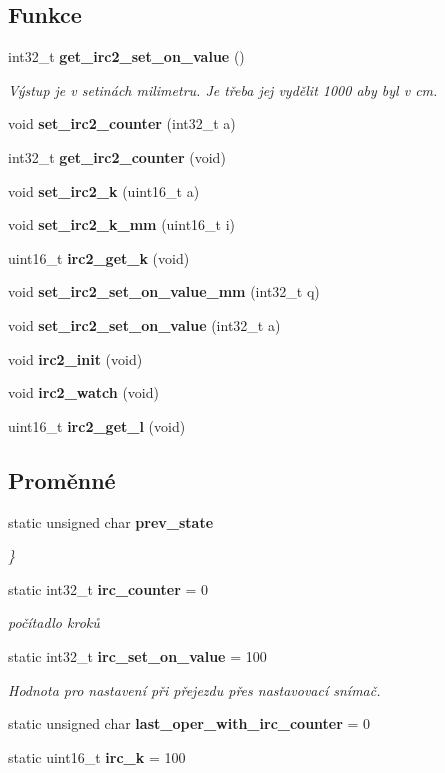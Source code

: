 \subsection*{Funkce}
\begin{DoxyCompactItemize}
\item 
int32\_\-t {\bf get\_\-irc2\_\-set\_\-on\_\-value} ()
\begin{DoxyCompactList}\small\item\em Výstup je v setinách milimetru. Je třeba jej vydělit 1000 aby byl v cm. \item\end{DoxyCompactList}\item 
void {\bf set\_\-irc2\_\-counter} (int32\_\-t a)
\item 
int32\_\-t {\bf get\_\-irc2\_\-counter} (void)
\item 
void {\bf set\_\-irc2\_\-k} (uint16\_\-t a)
\item 
void {\bf set\_\-irc2\_\-k\_\-mm} (uint16\_\-t i)
\item 
uint16\_\-t {\bf irc2\_\-get\_\-k} (void)
\item 
void {\bf set\_\-irc2\_\-set\_\-on\_\-value\_\-mm} (int32\_\-t q)
\item 
void {\bf set\_\-irc2\_\-set\_\-on\_\-value} (int32\_\-t a)
\item 
void {\bf irc2\_\-init} (void)
\item 
void {\bf irc2\_\-watch} (void)
\item 
uint16\_\-t {\bf irc2\_\-get\_\-l} (void)
\end{DoxyCompactItemize}
\subsection*{Proměnné}
\begin{DoxyCompactItemize}
\item 
static unsigned char {\bf prev\_\-state}
\begin{DoxyCompactList}\small\item\em \} \item\end{DoxyCompactList}\item 
static int32\_\-t {\bf irc\_\-counter} = 0
\begin{DoxyCompactList}\small\item\em počítadlo kroků \item\end{DoxyCompactList}\item 
static int32\_\-t {\bf irc\_\-set\_\-on\_\-value} = 100
\begin{DoxyCompactList}\small\item\em Hodnota pro nastavení při přejezdu přes nastavovací snímač. \item\end{DoxyCompactList}\item 
static unsigned char {\bf last\_\-oper\_\-with\_\-irc\_\-counter} = 0
\item 
static uint16\_\-t {\bf irc\_\-k} = 100
\end{DoxyCompactItemize}


